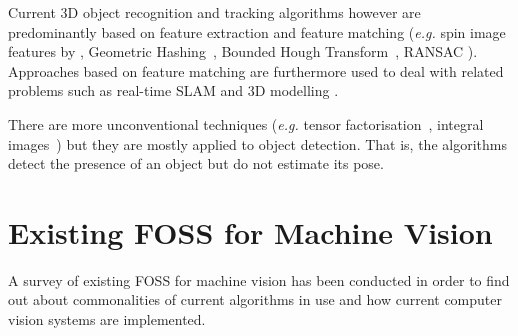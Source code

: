 \documentclass[12pt,a4paper,oneside,openright]{book}
\newcommand{\eg}{\emph{e.g.} }
\newcommand{\Ie}{That is, }
\begin{document}
\begin{CJK}{UTF8}{}
Current \ac{3D} object recognition and tracking algorithms however are predominantly based on feature extraction and feature matching (\eg spin image features by \citet{RefWorks:91}, Geometric Hashing~\citep{RefWorks:22}, Bounded Hough Transform~\citep{RefWorks:36}, \ac{RANSAC} \citep{RefWorks:84}). Approaches based on feature matching are furthermore used to deal with related problems such as real-time \ac{SLAM} \citep[\eg][]{RefWorks:569,RefWorks:513} and \ac{3D} modelling \citep[\eg][]{pan2009ProFORMA,RefWorks:499,RefWorks:354,RefWorks:500}.

There are more unconventional techniques (\eg tensor factorisation~\citep{RefWorks:564}, integral images~\citep{Viola01robustreal-time}) but they are mostly applied to object detection. \Ie the algorithms detect the presence of an object but do not estimate its pose.

\section{Existing \acs{FOSS} for Machine Vision}\label{cha:foss}
A survey of existing \ac{FOSS} for machine vision has been conducted in order to find out about commonalities of current algorithms in use and how current computer vision systems are implemented.


\end{CJK}
\end{document}
